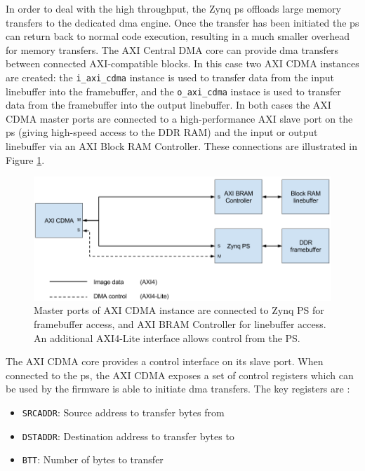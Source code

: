 In order to deal with the high throughput, the Zynq \gls{ps} offloads large memory transfers to the dedicated \gls{dma} engine. Once the transfer has been initiated the \gls{ps} can return back to normal code execution, resulting in a much smaller overhead for memory transfers. The AXI Central DMA core can provide \gls{dma} transfers between connected AXI-compatible blocks. In this case two AXI CDMA instances are created: the \texttt{i\_axi\_cdma} instance is used to transfer data from the input linebuffer into the framebuffer, and the \texttt{o\_axi\_cdma} instace is used to transfer data from the framebuffer into the output linebuffer. In both cases the AXI CDMA master ports are connected to a high-performance AXI slave port on the \gls{ps} (giving high-speed access to the DDR RAM) and the input or output linebuffer via an AXI Block RAM Controller. These connections are illustrated in Figure \ref{fig:axi_cdma}.

\begin{figure}
  \centering
  \includegraphics[width=1\textwidth]{./img/axi_cdma.png}
  \caption{Master ports of AXI CDMA instance are connected to Zynq PS for framebuffer access, and AXI BRAM Controller for linebuffer access. An additional AXI4-Lite interface allows control from the PS.}
  \label{fig:axi_cdma}
\end{figure}

The AXI CDMA core provides a control interface on its slave port. When connected to the \gls{ps}, the AXI CDMA exposes a set of control registers which can be used by the firmware is able to initiate \gls{dma} transfers. The key registers are \cite{xilinx:pg034}:
\begin{itemize}
  \item \texttt{SRCADDR}: Source address to transfer bytes from
  \item \texttt{DSTADDR}: Destination address to transfer bytes to 
  \item \texttt{BTT}: Number of bytes to transfer
\end{itemize}

